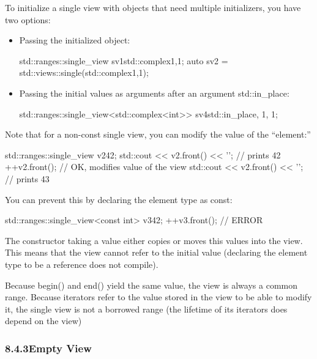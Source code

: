 To initialize a single view with objects that need multiple initializers, you have two options:

\begin{itemize}
\item
Passing the initialized object:

\begin{cpp}
std::ranges::single_view sv1{std::complex{1,1}};
auto sv2 = std::views::single(std::complex{1,1});
\end{cpp}

\item
Passing the initial values as arguments after an argument std::in\_place:

\begin{cpp}
std::ranges::single_view<std::complex<int>> sv4{std::in_place, 1, 1};
\end{cpp}
\end{itemize}

Note that for a non-const single view, you can modify the value of the “element:”

\begin{cpp}
std::ranges::single_view v2{42};
std::cout << v2.front() << '\n'; // prints 42
++v2.front(); // OK, modifies value of the view
std::cout << v2.front() << '\n'; // prints 43
\end{cpp}

You can prevent this by declaring the element type as const:

\begin{cpp}
std::ranges::single_view<const int> v3{42};
++v3.front(); // ERROR
\end{cpp}

The constructor taking a value either copies or moves this values into the view. This means that the view cannot refer to the initial value (declaring the element type to be a reference does not compile).

Because begin() and end() yield the same value, the view is always a common range. Because iterators refer to the value stored in the view to be able to modify it, the single view is not a borrowed range (the lifetime of its iterators does depend on the view)

\subsubsection*{ 8.4.3\hspace{0.2cm}Empty View}

